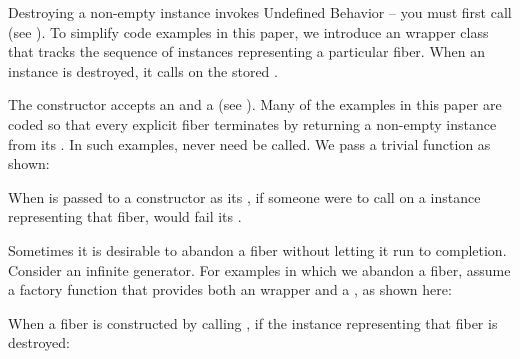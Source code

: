 \label{launch}

Destroying a non-empty \fiber instance invokes Undefined Behavior -- you must
first call \anycancel (see ). To simplify code examples in this paper, we introduce
an  wrapper class that tracks the sequence of \fiber instances
representing a particular fiber. When an  instance is
destroyed, it calls \cancel on the stored \fiber.


The \fiber constructor accepts an \entryfn and a \cancelfn (see
). Many of the examples in this paper are coded so that
every explicit fiber terminates by returning a non-empty \fiber instance from
its \entryfn. In such examples, \cancel never need be called. We pass a
trivial  function as shown:


When  is passed to a \fiber constructor as its \cancelfn,
if someone were to call \cancel on a \fiber instance representing that fiber,
 would fail its .

Sometimes it is desirable to abandon a fiber without letting it run to
completion. Consider an infinite generator. For examples in which we abandon a
fiber, assume a  factory function that provides both an \entryfn
wrapper and a \cancelfn, as shown here:


When a fiber is constructed by calling , if the 
instance representing that fiber is destroyed:

